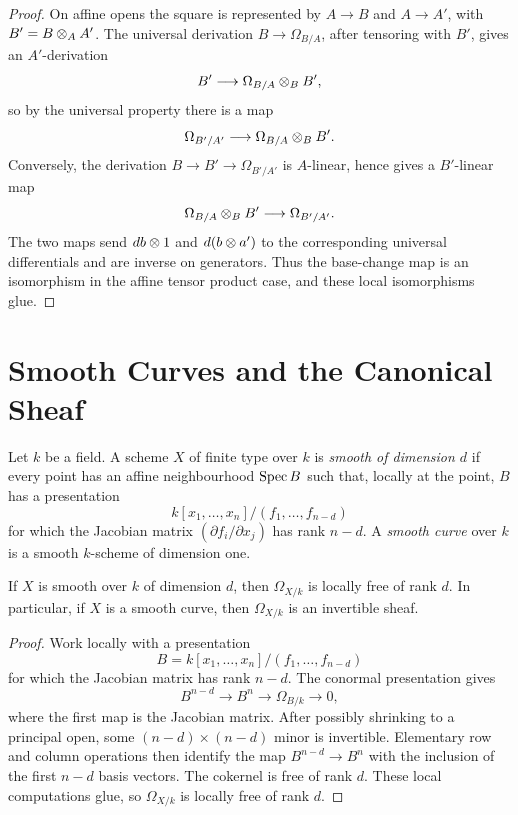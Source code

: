 \begin{proof}
On affine opens the square is represented by \(A\to B\) and \(A\to A'\), with
\(B'=B\otimes_A A'\).  The universal derivation \(B\to\Omega_{B/A}\), after
tensoring with \(B'\), gives an \(A'\)-derivation
\[
    B'\longrightarrow \Omega_{B/A}\otimes_B B',
\]
so by the universal property there is a map
\[
    \Omega_{B'/A'}\longrightarrow \Omega_{B/A}\otimes_B B'.
\]
Conversely, the derivation \(B\to B'\to\Omega_{B'/A'}\) is \(A\)-linear, hence
gives a \(B'\)-linear map
\[
    \Omega_{B/A}\otimes_B B'\longrightarrow \Omega_{B'/A'}.
\]
The two maps send \(db\otimes1\) and \(d(b\otimes a')\) to the corresponding
universal differentials and are inverse on generators.  Thus the base-change
map is an isomorphism in the affine tensor product case, and these local
isomorphisms glue.
\end{proof}

\section{Smooth Curves and the Canonical Sheaf}

\begin{definition}
Let \(k\) be a field.  A scheme \(X\) of finite type over \(k\) is \emph{smooth
of dimension \(d\)} if every point has an affine neighbourhood
\(\operatorname{Spec} B\) such that, locally at the point, \(B\) has a presentation
\[
    k[x_1,\ldots,x_n]/(f_1,\ldots,f_{n-d})
\]
for which the Jacobian matrix
\((\partial f_i/\partial x_j)\) has rank \(n-d\).  A \emph{smooth curve} over
\(k\) is a smooth \(k\)-scheme of dimension one.
\end{definition}

\begin{proposition}
If \(X\) is smooth over \(k\) of dimension \(d\), then \(\Omega_{X/k}\) is
locally free of rank \(d\).  In particular, if \(X\) is a smooth curve, then
\(\Omega_{X/k}\) is an invertible sheaf.
\end{proposition}

\begin{proof}
Work locally with a presentation
\[
    B=k[x_1,\ldots,x_n]/(f_1,\ldots,f_{n-d})
\]
for which the Jacobian matrix has rank \(n-d\).  The conormal presentation gives
\[
    B^{n-d}\longrightarrow B^n\longrightarrow\Omega_{B/k}\to0,
\]
where the first map is the Jacobian matrix.  After possibly shrinking to a
principal open, some \((n-d)\times(n-d)\) minor is invertible.  Elementary row
and column operations then identify the map \(B^{n-d}\to B^n\) with the
inclusion of the first \(n-d\) basis vectors.  The cokernel is free of rank
\(d\).  These local computations glue, so \(\Omega_{X/k}\) is locally free of
rank \(d\).
\end{proof}

